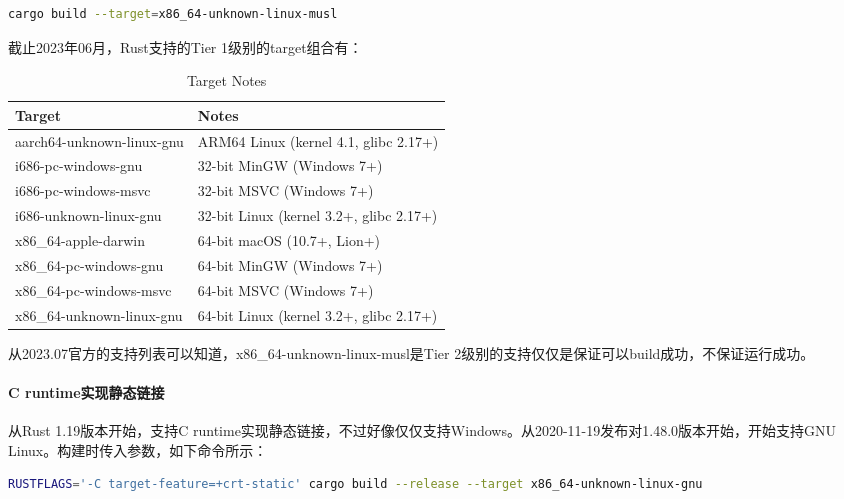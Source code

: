 \documentclass[../../../dolphin-book-2023.tex]{subfiles}
\begin{document}
\begin{lstlisting}[language=Bash]
cargo build --target=x86_64-unknown-linux-musl
\end{lstlisting}

截止2023年06月，Rust支持的Tier 1级别的target组合有：

\begin{table}[h]
    \centering
    \begin{tabular}{|l|l|}
    \hline
    \textbf{Target} & \textbf{Notes} \\ \hline
    aarch64-unknown-linux-gnu & ARM64 Linux (kernel 4.1, glibc 2.17+)  \\ \hline
    i686-pc-windows-gnu & 32-bit MinGW (Windows 7+)  \\ \hline
    i686-pc-windows-msvc & 32-bit MSVC (Windows 7+)  \\ \hline
    i686-unknown-linux-gnu & 32-bit Linux (kernel 3.2+, glibc 2.17+) \\ \hline
    x86\_64-apple-darwin & 64-bit macOS (10.7+, Lion+) \\ \hline
    x86\_64-pc-windows-gnu & 64-bit MinGW (Windows 7+)  \\ \hline
    x86\_64-pc-windows-msvc & 64-bit MSVC (Windows 7+)  \\ \hline
    x86\_64-unknown-linux-gnu & 64-bit Linux (kernel 3.2+, glibc 2.17+) \\ \hline
    \end{tabular}
    \caption{Target Notes}
    \label{tab:target-notes}
\end{table}

从2023.07官方的支持列表可以知道，x86\_64-unknown-linux-musl是Tier 2级别的支持仅仅是保证可以build成功，不保证运行成功。

\paragraph{C runtime实现静态链接}

从Rust 1.19版本开始，支持C runtime实现静态链接，不过好像仅仅支持Windows。从2020-11-19发布对1.48.0版本开始，开始支持GNU Linux。构建时传入参数，如下命令所示：

\begin{lstlisting}[language=Bash]
RUSTFLAGS='-C target-feature=+crt-static' cargo build --release --target x86_64-unknown-linux-gnu
\end{lstlisting}
\end{document}
